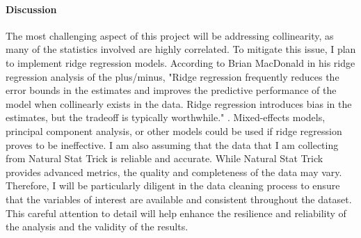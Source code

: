 \documentclass[12pt]{article}
\begin{document}
\paragraph{Discussion}
The most challenging aspect of this project will be addressing collinearity, as many of the statistics involved are highly correlated. 
To mitigate this issue, I plan to implement ridge regression models. According to Brian MacDonald in his ridge regression analysis 
of the plus/minus, "Ridge regression frequently reduces the error bounds in the estimates and improves the predictive performance 
of the model when collinearly exists in the data. Ridge regression introduces bias in the estimates, but the tradeoff is typically 
worthwhile." \cite{Macdonald_2012}. Mixed-effects models, principal component analysis, or other models could be used if ridge regression 
proves to be ineffective. I am also assuming that the data that I am collecting from Natural Stat Trick is reliable and accurate. While 
Natural Stat Trick provides advanced metrics, the quality and completeness of the data may vary.  Therefore, I will be particularly diligent 
in the data cleaning process to ensure that the variables of interest are available and consistent throughout the dataset. This 
careful attention to detail will help enhance the resilience and reliability of the analysis and the validity of the results.




\end{document}

